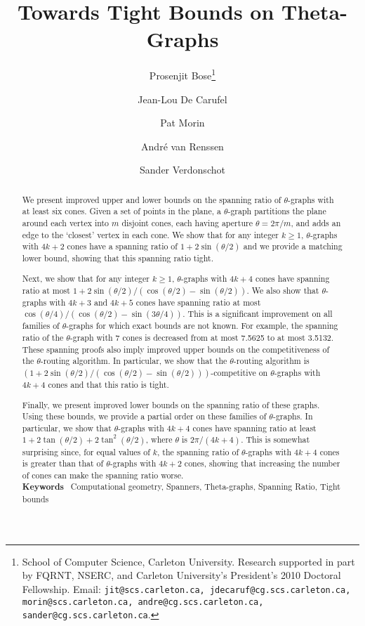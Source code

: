 \documentclass[12pt]{article}
\title{Towards Tight Bounds on Theta-Graphs}
\author{
Prosenjit Bose\thanks{School of Computer Science, Carleton University. Research supported in part by FQRNT, NSERC, and Carleton University's President's 2010 Doctoral Fellowship. Email: \texttt{jit@scs.carleton.ca, jdecaruf@cg.scs.carleton.ca, morin@scs.carleton.ca, andre@cg.scs.carleton.ca, sander@cg.scs.carleton.ca}.}
\and
\addtocounter{footnote}{-1}
Jean-Lou De Carufel\footnotemark
\and 
\addtocounter{footnote}{-1}
Pat Morin\footnotemark
\and 
\addtocounter{footnote}{-1}
Andr\'e van Renssen\footnotemark
\and
\addtocounter{footnote}{-1}
Sander Verdonschot\footnotemark
}
\date{}
\newcommand{\keywords}[1]{\noindent\textbf{Keywords}~ #1}
\begin{document}
\maketitle

\begin{abstract}
  We present improved upper and lower bounds on the spanning ratio of $\theta$-graphs with at least six cones. Given a set of points in the plane, a $\theta$-graph partitions the plane around each vertex into $m$ disjoint cones, each having aperture $\theta = 2 \pi/m$, and adds an edge to the `closest' vertex in each cone. We show that for any integer $k \geq 1$, $\theta$-graphs with $4k + 2$ cones have a spanning ratio of $1 + 2 \sin(\theta/2)$ and we provide a matching lower bound, showing that this spanning ratio tight. 

  Next, we show that for any integer $k \geq 1$, $\theta$-graphs with $4k + 4$ cones have spanning ratio at most $1 + 2 \sin(\theta/2) / (\cos(\theta/2) - \sin(\theta/2))$. We also show that $\theta$-graphs with $4k + 3$ and $4k + 5$ cones have spanning ratio at most $\cos (\theta/4) / (\cos (\theta/2) - \sin (3\theta/4))$. This is a significant improvement on all families of $\theta$-graphs for which exact bounds are not known. For example, the spanning ratio of the $\theta$-graph with 7 cones is decreased from at most 7.5625 to at most 3.5132. These spanning proofs also imply improved upper bounds on the competitiveness of the $\theta$-routing algorithm. In particular, we show that the $\theta$-routing algorithm is $(1 + 2 \sin(\theta/2) / (\cos(\theta/2) - \sin(\theta/2)))$-competitive on $\theta$-graphs with $4k + 4$ cones and that this ratio is tight.  

  Finally, we present improved lower bounds on the spanning ratio of these graphs. Using these bounds, we provide a partial order on these families of $\theta$-graphs. In particular, we show that $\theta$-graphs with $4k + 4$ cones have spanning ratio at least $1 + 2 \tan(\theta/2) + 2 \tan^2(\theta/2)$, where $\theta$ is $2 \pi / (4k + 4)$. This is somewhat surprising since, for equal values of $k$, the spanning ratio of $\theta$-graphs with $4k + 4$ cones is greater than that of $\theta$-graphs with $4k + 2$ cones, showing that increasing the number of cones can make the spanning ratio worse. \\

  \keywords{Computational geometry, Spanners, Theta-graphs, Spanning Ratio, Tight bounds}
\end{abstract}
\end{document}
